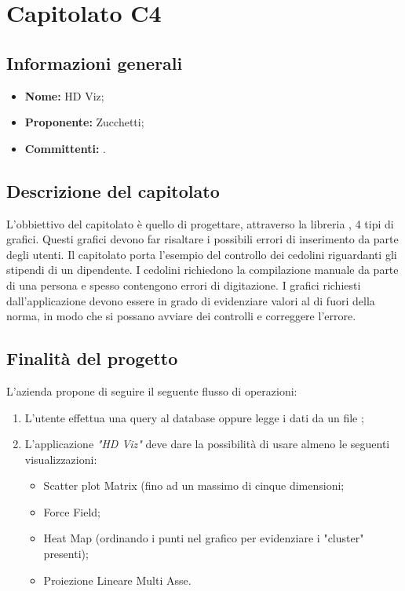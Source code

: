 \section{Capitolato C4}

\subsection{Informazioni generali}
\begin{itemize}
\item \textbf{Nome:} HD Viz;
\item \textbf{Proponente:} Zucchetti;
\item \textbf{Committenti:} \committenti{}.
\end{itemize}

\subsection{Descrizione del capitolato}
L'obbiettivo del capitolato è quello di progettare, attraverso la libreria , 4 tipi di grafici. Questi grafici devono far risaltare i possibili errori di inserimento da parte degli utenti.
Il capitolato porta l'esempio del controllo dei cedolini riguardanti gli stipendi di un dipendente. I cedolini richiedono la compilazione manuale da parte di una persona e spesso contengono errori di digitazione. I grafici richiesti dall'applicazione devono essere in grado di evidenziare valori al di fuori della norma, in modo che si possano avviare dei controlli e correggere l'errore.

\subsection{Finalità del progetto}
L'azienda propone di seguire il seguente flusso di operazioni:
\begin{enumerate}
\item L'utente effettua una query al database oppure legge i dati da un file ;
\item L'applicazione \textit{"HD Viz"} deve dare la possibilità di usare almeno le seguenti visualizzazioni:
    \begin{itemize}
    \item Scatter plot Matrix (fino ad un massimo di cinque dimensioni;
    \item Force Field;
    \item Heat Map (ordinando i punti nel grafico per evidenziare i "cluster" presenti);
    \item Proiezione Lineare Multi Asse.
    \end{itemize}
\end{enumerate}

